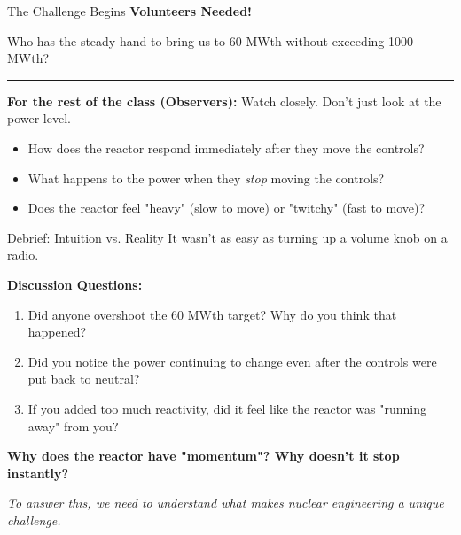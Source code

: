 \documentclass[aspectratio=169]{beamer}
\begin{document}
\begin{frame}[allowframebreaks]{The Challenge Begins}
    \centering
    \Huge \textbf{Volunteers Needed!}

    \vspace{2em}
    \normalsize
    Who has the steady hand to bring us to 60 MWth without exceeding 1000 MWth?

    \vspace{2em}
    \hrule
    \vspace{1em}

    \textbf{For the rest of the class (Observers):}
    Watch closely. Don't just look at the power level.
    \begin{itemize}
        \item How does the reactor respond immediately after they move the controls?
        \item What happens to the power when they \textit{stop} moving the controls?
        \item Does the reactor feel "heavy" (slow to move) or "twitchy" (fast to move)?
    \end{itemize}
\end{frame}

\begin{frame}[allowframebreaks]{Debrief: Intuition vs. Reality}
    It wasn't as easy as turning up a volume knob on a radio.

    \vspace{1em}

    \textbf{Discussion Questions:}
    \begin{enumerate}
        \item Did anyone overshoot the 60 MWth target? Why do you think that happened?
        \item Did you notice the power continuing to change even after the controls were put back to neutral?
        \item If you added too much reactivity, did it feel like the reactor was "running away" from you?
    \end{enumerate}

    \vspace{1em}
    \begin{center}
        \textbf{Why does the reactor have "momentum"? Why doesn't it stop instantly?}
        
        \textit{To answer this, we need to understand what makes nuclear engineering a unique challenge.}
    \end{center}
\end{frame}
\end{document}
